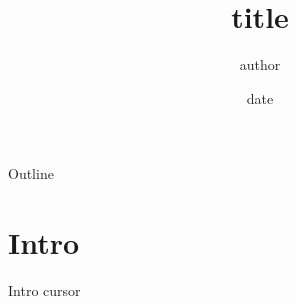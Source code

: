 \documentclass[11pt]{beamer}
\title{ {{title}} }
\author{ {{author}} }
\date{ {{date}} }
\begin{document}
\begin{frame}
  \titlepage
\end{frame}

\begin{frame}{Outline}
  \tableofcontents
\end{frame}

\section{Intro}

\begin{frame}{Intro}
  {{cursor}}
\end{frame}
\end{document}
